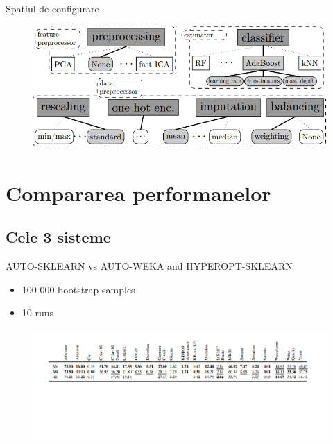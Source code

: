 \documentclass{beamer}
\begin{document}
	\begin{frame}{Spatiul de configurare}
		\begin{figure}[H]
			\centering
			\includegraphics[scale=0.6]{pipeline.PNG}
		\end{figure}	
	\end{frame}
\section{Compararea performanelor}
	\subsection{Cele 3 sisteme}
	\begin{frame}{AUTO-SKLEARN vs AUTO-WEKA and HYPEROPT-SKLEARN}
		\begin{itemize}
			\item 100 000 bootstrap samples
			\item 10 runs
		\end{itemize}
		\begin{figure}[H]
			\centering
			\includegraphics[scale=0.75]{tabel_cmp.png}
		\end{figure}	
		
		
	\end{frame}
\end{document}

